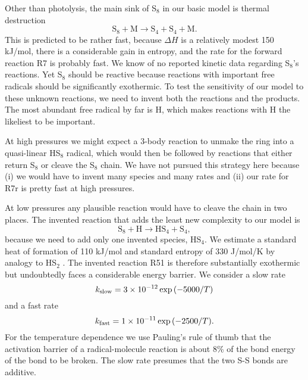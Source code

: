 \documentclass[preprint]{aastex}
\newcounter{reaction}
\begin{document}
Other than photolysis, the main sink of S$_8$ in our basic model is thermal destruction
\begin{equation}\tag{R7r}
\mathrm{S}_8 + \mathrm{M} \rightarrow \mathrm{S}_4 + \mathrm{S}_4 + \mathrm{M} .
\end{equation}
This is predicted to be rather fast, because $\Delta H$ is a relatively modest 150 kJ/mol,
there is a considerable gain in entropy, and the rate for the forward reaction R7 is probably fast.
We know of no reported kinetic data regarding S$_8$'s reactions.
Yet S$_8$ should be reactive because reactions with important free radicals should be significantly exothermic.
To test the sensitivity of our model to these unknown reactions, we need to invent both the reactions and the products.
The most abundant free radical by far is H, which makes reactions with H the likeliest to be important.

At high pressures we might expect a 3-body reaction to unmake the ring into a quasi-linear HS$_8$ radical,
which would then be followed by reactions that either return S$_8$ or cleave the S$_8$ chain.
We have not pursued this strategy here because (i) we would have to invent many species and many rates
and (ii) our rate for R7r is pretty fast at high pressures.

At low pressures any plausible reaction would have to cleave the chain in two places.
The invented reaction that adds the least new complexity to our model is
\begin{equation}\tag{R51}
\mathrm{S}_8 + \mathrm{H} \rightarrow \mathrm{HS}_4 + \mathrm{S}_4,
\end{equation}
because we need to add only one invented species, HS$_4$.
We estimate a standard heat of formation of 110 kJ/mol and standard entropy of 330 J/mol/K
 by analogy to HS$_2$ \citep{Benson1978}.
The invented reaction R51 is therefore substantially exothermic but undoubtedly faces a considerable energy barrier.
We consider a slow rate   
\begin{equation}\label{slow}
k_{\rm slow} = 3\times 10^{-12} \exp{\left(-5000/T\right)}
\end{equation}
and a fast rate   
\begin{equation}\label{fast}
k_{\rm fast} = 1\times 10^{-11} \exp{\left(-2500/T\right)} .
\end{equation}
For the temperature dependence we use Pauling's rule of thumb \citep[][p.\ 568]{Pauling1970} that the
activation barrier of a radical-molecule reaction is about 8\% of the bond energy of the bond to be broken.
The slow rate presumes that the two S-S bonds are additive.
\end{document}
